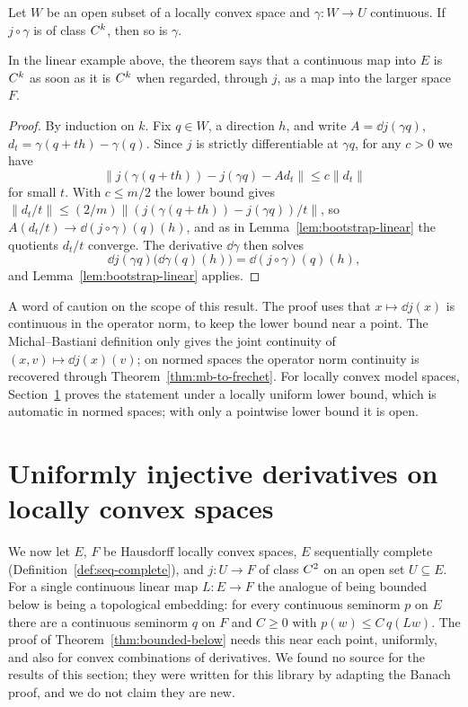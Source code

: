 \begin{theorem}
  \label{thm:bounded-below}
  \leanok
  Let $W$ be an open subset of a locally convex space and $\gamma \colon W \to U$ continuous. If
  $j \circ \gamma$ is of class $C^{k}$, then so is $\gamma$.
\end{theorem}

In the linear example above, the theorem says that a continuous map into $E$ is $C^{k}$ as soon
as it is $C^{k}$ when regarded, through $j$, as a map into the larger space $F$.

\begin{proof}
  \leanok
  By induction on $k$. Fix $q \in W$, a direction $h$, and write $A = \dd j(\gamma q)$,
  $d_t = \gamma(q + th) - \gamma(q)$. Since $j$ is strictly differentiable at $\gamma q$, for
  any $c > 0$ we have
  \[
    \|j(\gamma(q + th)) - j(\gamma q) - A d_t\| \le c \|d_t\|
  \]
  for small $t$. With $c \le m/2$ the lower bound gives
  $\|d_t / t\| \le (2/m) \|(j(\gamma(q+th)) - j(\gamma q))/t\|$, so
  $A(d_t/t) \to \dd(j\circ\gamma)(q)(h)$, and as in Lemma~\ref{lem:bootstrap-linear} the
  quotients $d_t/t$ converge. The derivative $\dd\gamma$ then solves
  \[
    \dd j(\gamma q)\bigl(\dd\gamma(q)(h)\bigr) = \dd(j \circ \gamma)(q)(h),
  \]
  and Lemma~\ref{lem:bootstrap-linear} applies.
\end{proof}

\begin{remark}
  A word of caution on the scope of this result. The proof uses that $x \mapsto \dd j(x)$ is
  continuous in the operator norm, to keep the lower bound near a point. The Michal--Bastiani
  definition only gives the joint continuity of $(x, v) \mapsto \dd j(x)(v)$; on normed spaces
  the operator norm continuity is recovered through Theorem~\ref{thm:mb-to-frechet}. For
  locally convex model spaces, Section~\ref{sec:equi-embedding} proves the statement under a
  locally uniform lower bound, which is automatic in normed spaces; with only a pointwise lower
  bound it is open.
\end{remark}

\section{Uniformly injective derivatives on locally convex spaces}
\label{sec:equi-embedding}

We now let $E$, $F$ be Hausdorff locally convex spaces, $E$ sequentially complete
(Definition~\ref{def:seq-complete}), and $j \colon U \to F$ of class $C^{2}$ on an open set
$U \subseteq E$. For a single continuous linear map $L \colon E \to F$ the analogue of being
bounded below is being a topological embedding: for every continuous seminorm $p$ on $E$ there
are a continuous seminorm $q$ on $F$ and $C \ge 0$ with $p(w) \le C\, q(Lw)$. The proof of
Theorem~\ref{thm:bounded-below} needs this near each point, uniformly, and also for convex
combinations of derivatives. We found no source for the results of this section; they were
written for this library by adapting the Banach proof, and we do not claim they are new.

